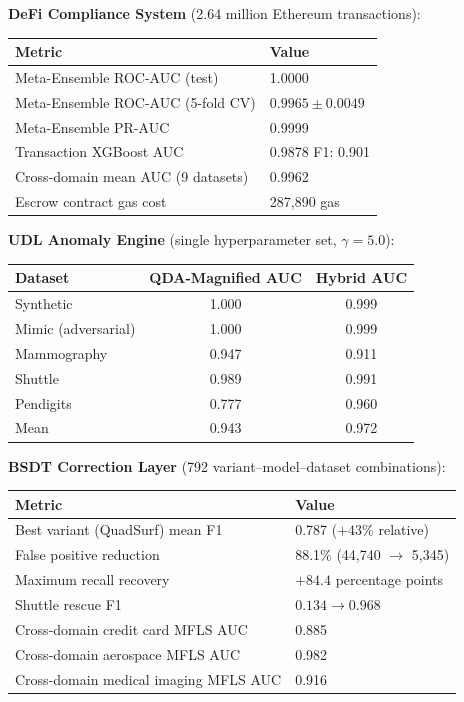 \documentclass[12pt,a4paper]{article}
\begin{document}
\textbf{DeFi Compliance System} (2.64 million Ethereum transactions):
\begin{center}
\begin{tabular}{ll}
\toprule
\textbf{Metric} & \textbf{Value} \\
\midrule
Meta-Ensemble ROC-AUC (test) & 1.0000 \\
Meta-Ensemble ROC-AUC (5-fold CV) & $0.9965\pm0.0049$ \\
Meta-Ensemble PR-AUC & 0.9999 \\
Transaction XGBoost AUC & 0.9878 \quad F1: 0.901 \\
Cross-domain mean AUC (9 datasets) & 0.9962 \\
Escrow contract gas cost & 287,890 gas \\
\bottomrule
\end{tabular}
\end{center}

\textbf{UDL Anomaly Engine} (single hyperparameter set, $\gamma{=}5.0$):
\begin{center}
\begin{tabular}{lcc}
\toprule
\textbf{Dataset} & \textbf{QDA-Magnified AUC} & \textbf{Hybrid AUC}\\
\midrule
Synthetic & 1.000 & 0.999 \\
Mimic (adversarial) & 1.000 & 0.999 \\
Mammography & 0.947 & 0.911 \\
Shuttle & 0.989 & 0.991 \\
Pendigits & 0.777 & 0.960 \\
Mean & 0.943 & 0.972 \\
\bottomrule
\end{tabular}
\end{center}

\textbf{BSDT Correction Layer} (792 variant--model--dataset combinations):
\begin{center}
\begin{tabular}{ll}
\toprule
\textbf{Metric} & \textbf{Value} \\
\midrule
Best variant (QuadSurf) mean F1 & 0.787 ($+43\%$ relative) \\
False positive reduction & 88.1\% (44,740 $\to$ 5,345) \\
Maximum recall recovery & $+84.4$ percentage points \\
Shuttle rescue F1 & $0.134\to 0.968$ \\
Cross-domain credit card MFLS AUC & 0.885 \\
Cross-domain aerospace MFLS AUC & 0.982 \\
Cross-domain medical imaging MFLS AUC & 0.916 \\
\bottomrule
\end{tabular}
\end{center}
\end{document}
